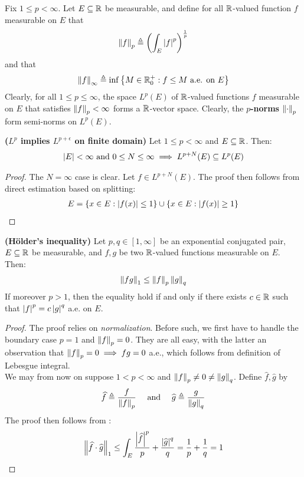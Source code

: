 \documentclass{report}
\begin{document}
Fix $1\leq p <\infty$. Let $E\subseteq \mathbb{R}$ be measurable, and define for all $\mathbb{R}$-valued function $f$ measurable on $E$ that 
 \begin{align*}
\left\| f \right\|_p \triangleq \left(\int_E \left|f\right|^p  \right)^{\frac{1}{p}}
\end{align*}
and that
\begin{align*}
\left\| f \right\|_\infty \triangleq \inf \left\{ M\in\mathbb{R}_0^+ : f\leq M\text{ a.e. on $E$} \right\}
\end{align*}
Clearly, for all $1\leq p\leq \infty$, the space $L^p(E)$ of $\mathbb{R}$-valued functions  $f$ measurable on $E$ that satisfies  $\left\| f \right\|_p < \infty$ forms a $\mathbb{R}$-vector space. Clearly, the  \textbf{$p$-norms} $\left\| \cdot \right\|_p$ form semi-norms on $L^p(E)$.
\begin{theorem}
\textbf{($L^p$ implies  $L^{p+\epsilon }$ on finite domain)} Let $1\leq p< \infty$ and $E\subseteq \mathbb{R}$. Then: 
\begin{align*}
  \left|E\right|<\infty \text{ and } 0\leq N \leq \infty \implies L^{p+N}(E)\subseteq L^p(E)
\end{align*}
\end{theorem}
\begin{proof}
  The $N= \infty$ case is clear. Let $f \in L^{p+N}(E)$. The proof then follows from direct estimation based on splitting: 
\begin{align*}
  E= \left\{ x \in E: \left|f(x)\right|\leq 1 \right\}\cup  \left\{ x \in E: \left|f(x)\right|\geq 1 \right\}
\end{align*}
\end{proof}
\begin{theorem}
\label{THHi}
\textbf{(Hölder's inequality)} Let  $p,q\in [1,\infty]$ be an exponential conjugated pair, $E\subseteq \mathbb{R}$ be measurable, and $f,g$ be two $\mathbb{R}$-valued functions  measurable on $E$. Then: 
 \begin{align*}
\left\| fg \right\|_1 \leq  \left\| f \right\|_p \left\| g \right\|_q
\end{align*}
If moreover $p>1$, then the equality hold if and only if there exists  $c\in\mathbb{R}$ such that $\left|f\right|^p=c\left|g\right|^q$ a.e. on  $E$. 
\end{theorem}
\begin{proof}
  The proof relies on \emph{normalization}. Before such, we first have to handle the boundary case $p=1$ and $\left\| f \right\|_p=0$.  They are all easy, with the latter an observation that $\left\| f \right\|_p=0 \implies fg=0$ a.e., which follows from definition of Lebesgue integral. \\

We may from now on suppose $1<p<\infty$ and $\left\| f \right\|_p\neq 0 \neq \left\| g \right\|_q$. Define $\widehat{f},\widehat{g}$ by 
\begin{align*}
\widehat{f}\triangleq \frac{f}{\left\| f \right\|_p}\quad \text{ and }\quad \widehat{g}\triangleq \frac{g}{\left\| g \right\|_q} 
\end{align*}
The proof then follows from :
\begin{align*}
\left\| \widehat{f} \cdot \widehat{g} \right\|_1 \leq \int_E \frac{\left|\widehat{f}\right|^p}{p}  + \frac{\left|\widehat{g}\right|^q}{q}  = \frac{1}{p}+ \frac{1}{q}=1
\end{align*}
\end{proof}
\end{document}
